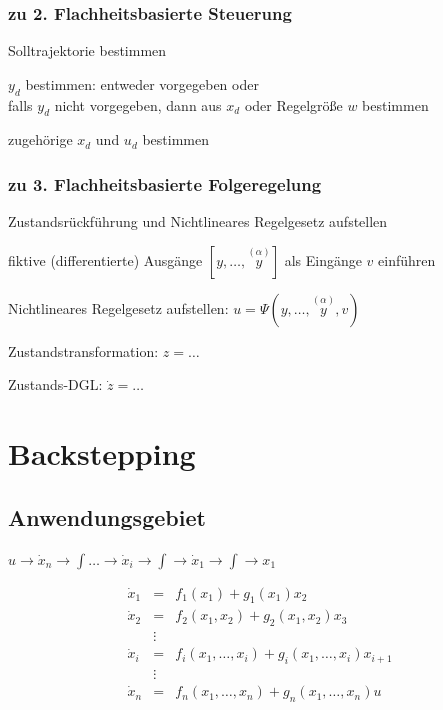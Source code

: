 \documentclass[german]{latex4ei/latex4ei_sheet}
\newcommand{\os}[2]{\ensuremath{\overset{#1}{#2}}}
\begin{document}
\begin{sectionbox}
\subsubsection{zu 2. Flachheitsbasierte Steuerung}
\begin{cookbox}{Solltrajektorie bestimmen}
  \item $y_d$ bestimmen: entweder vorgegeben oder\\
    falls $y_d$ nicht vorgegeben, dann aus $x_d$ oder Regelgröße $w$ bestimmen
  \item zugehörige $x_d$ und $u_d$ bestimmen
\end{cookbox}

\subsubsection{zu 3. Flachheitsbasierte Folgeregelung}
\begin{cookbox}{Zustandsrückführung und Nichtlineares Regelgesetz aufstellen}
  \item fiktive (differentierte) Ausgänge $\left[ y, \dots, \os{(\alpha)}{y} \right]$ als Eingänge $v$ einführen
  \item Nichtlineares Regelgesetz aufstellen: $u = \Psi\left( y, \dots, \os{(\alpha)}{y}, v \right)$
  \item Zustandstransformation: $z = \dots$
  \item Zustands-DGL: $\dot{z} = \dots$
\end{cookbox}
\end{sectionbox}

\section{Backstepping}
\begin{sectionbox}
\subsection{Anwendungsgebiet}
$u \rightarrow \dot{x}_n \rightarrow \int \dots \rightarrow \dot{x}_i \rightarrow \int \rightarrow \dot{x}_1 \rightarrow \int \rightarrow x_1$

\begin{align*}
  \dot{x}_1 &=      & f_1(x_1) + g_1(x_1)x_2 \\
  \dot{x}_2 &=      & f_2(x_1, x_2) + g_2(x_1, x_2)x_3 \\
            &\vdots & \\
  \dot{x}_i &=      & f_i(x_1, \dots, x_i) + g_i(x_1, \dots, x_i)x_{i+1} \\
            &\vdots & \\
  \dot{x}_n &=      & f_n(x_1, \dots, x_n) + g_n(x_1, \dots, x_n)u
\end{align*}
\end{sectionbox}
\end{document}

